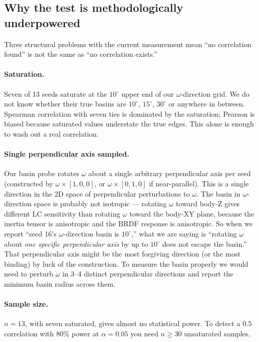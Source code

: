 \documentclass[11pt,a4paper]{article}
\begin{document}
\subsection{Why the test is methodologically underpowered}

Three structural problems with the current measurement mean ``no correlation found'' is not the same as ``no correlation exists.''

\paragraph{Saturation.} Seven of 13 seeds saturate at the $10^\circ$ upper end of our $\omega$-direction grid. We do not know whether their true basins are $10^\circ$, $15^\circ$, $30^\circ$ or anywhere in between. Spearman correlation with seven ties is dominated by the saturation; Pearson is biased because saturated values understate the true edges. This alone is enough to wash out a real correlation.

\paragraph{Single perpendicular axis sampled.} Our basin probe rotates $\omega$ about a single arbitrary perpendicular axis per seed (constructed by $\omega \times [1, 0, 0]$, or $\omega \times [0, 1, 0]$ if near-parallel). This is a single direction in the 2D space of perpendicular perturbations to $\omega$. The basin in $\omega$-direction space is probably not isotropic --- rotating $\omega$ toward body-Z gives different LC sensitivity than rotating $\omega$ toward the body-XY plane, because the inertia tensor is anisotropic and the BRDF response is anisotropic. So when we report ``seed 16's $\omega$-direction basin is $10^\circ$,'' what we are saying is ``rotating $\omega$ about \emph{one specific perpendicular axis} by up to $10^\circ$ does not escape the basin.'' That perpendicular axis might be the most forgiving direction (or the most binding) by luck of the construction. To measure the basin properly we would need to perturb $\omega$ in 3--4 distinct perpendicular directions and report the minimum basin radius across them.

\paragraph{Sample size.} $n = 13$, with seven saturated, gives almost no statistical power. To detect a 0.5 correlation with 80\% power at $\alpha=0.05$ you need $n \geq 30$ unsaturated samples.
\end{document}
